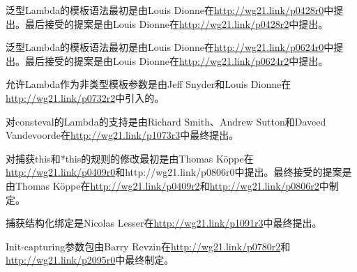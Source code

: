 泛型Lambda的模板语法最初是由Louis Dionne在\url{http://wg21.link/p0428r0}中提出。最后接受的提案是由Louis Dionne在\url{http://wg21.link/p0428r2}中提出。

泛型Lambda的模板语法最初是由Louis Dionne在\url{http://wg21.link/p0624r0}中提出。最后接受的提案是由Louis Dionne在\url{http://wg21.link/p0624r2}中提出。

允许Lambda作为非类型模板参数是由Jeff Snyder和Louis Dionne在\url{http://wg21.link/p0732r2}中引入的。

对consteval的Lambda的支持是由Richard Smith、Andrew Sutton和Daveed Vandevoorde在\url{http://wg21.link/p1073r3}中最终提出。

对捕获this和*this的规则的修改最初是由Thomas Köppe在\url{http://wg21.link/p0409r0}和http://wg21.link/p0806r0中提出。最终接受的提案是由Thomas Köppe在\url{http://wg21.link/p0409r2}和\url{http://wg21.link/p0806r2}中制定。

捕获结构化绑定是Nicolas Lesser在\url{http://wg21.link/p1091r3}中最终提出。

Init-capturing参数包由Barry Revzin在\url{http://wg21.link/p0780r2}和\url{http://wg21.link/p2095r0}中最终制定。